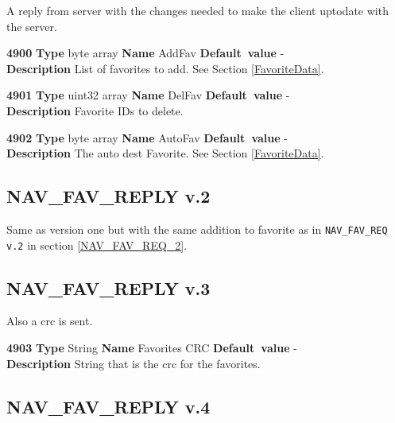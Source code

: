 \documentclass[a4paper]{article}
\begin{document}
A reply from server with the changes needed to make the client uptodate with
the server.
\begin{list}{\textbf{ParamID}}{}
\item \textbf{4900} \textbf{Type} byte array \textbf{Name} AddFav
                 \textbf{Default~value} - \\
  \label{AddFav}
  \textbf{Description} List of favorites to add. See Section 
  \ref{FavoriteData}.
\item \textbf{4901} \textbf{Type} uint32 array \textbf{Name} DelFav
                 \textbf{Default~value} - \\
  \label{DelFav}
  \textbf{Description} Favorite IDs to delete.
\item \textbf{4902} \textbf{Type} byte array \textbf{Name} AutoFav
                 \textbf{Default~value} - \\
  \label{AutoFav}
  \textbf{Description} The auto dest Favorite. See Section \ref{FavoriteData}.
\end{list}

\subsection{NAV\_FAV\_REPLY v.2}

Same as version one but with the same addition to favorite as in
\texttt{NAV\_FAV\_REQ v.2} in section \ref{NAV_FAV_REQ_2}.

\subsection{NAV\_FAV\_REPLY v.3}

Also a crc is sent.
\begin{list}{\textbf{ParamID}}{}
\item \textbf{4903} \textbf{Type} String \textbf{Name} Favorites CRC
                 \textbf{Default~value} - \\
  \textbf{Description} String that is the crc for the favorites.
\end{list}

\subsection{NAV\_FAV\_REPLY v.4}
\end{document}
